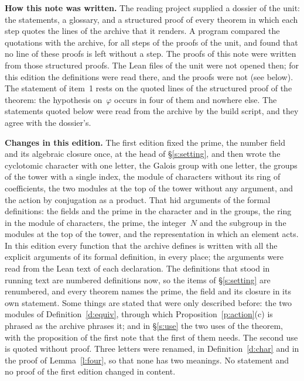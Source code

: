 \documentclass[11pt,a4paper]{article}
\newcommand{\subhead}[1]{\par\addvspace{9pt plus 2pt}\Needspace{4\baselineskip}\noindent\textbf{#1}\enspace\ignorespaces}
\theoremstyle{plainx}
\theoremstyle{uprightx}
\begin{document}
\subhead{How this note was written.} The reading project supplied a dossier of the unit: the statements, a
glossary, and a structured proof of every theorem in which each step quotes the lines of the archive that it
renders. A program compared the quotations with the archive, for all \UnitSteps{} steps of the \UnitProofs{}
proofs of the unit, and found that no line of these proofs is left without a step. The proofs of this note were
written from those structured proofs. The Lean files of the unit were not opened then; for this edition the
definitions were read there, and the proofs were not (see below). The statement of item~1 rests
on the quoted lines of the structured proof of the theorem: the hypothesis on~$\varphi$ occurs in four of them
and nowhere else. The statements quoted below were read from the archive by the build script, and they agree
with the dossier's.

\subhead{Changes in this edition.} The first edition fixed the prime, the number field and its algebraic closure
once, at the head of §\ref{s:setting}, and then wrote the cyclotomic character with one letter, the Galois group
with one letter, the groups of the tower with a single index, the module of characters without its ring of
coefficients, the two modules at the top of the tower without any argument, and the action by conjugation as a
product. That hid arguments of the formal definitions: the fields and the prime in the character and in the
groups, the ring in the module of characters, the prime, the integer~$N$ and the subgroup in the modules at the
top of the tower, and the representation in which an element acts. In this edition every function that the
archive defines is written with all the explicit arguments of its formal definition, in every place; the
arguments were read from the Lean text of each declaration. The definitions that stood in running text are
numbered definitions now, so the items of §\ref{s:setting} are renumbered, and every theorem names the prime, the
field and its closure in its own statement. Some things are stated that were only described before: the two
modules of Definition~\ref{d:equiv}, through which Proposition~\ref{p:action}(c) is phrased as the archive
phrases it; and in §\ref{s:use} the two uses of the theorem, with the proposition of the first note that the first
of them needs. The second use is quoted without proof. Three letters were renamed, in Definition~\ref{d:char} and
in the proof of Lemma~\ref{l:four}, so that none has two meanings. No statement and no proof of the first edition
changed in content.
\end{document}
